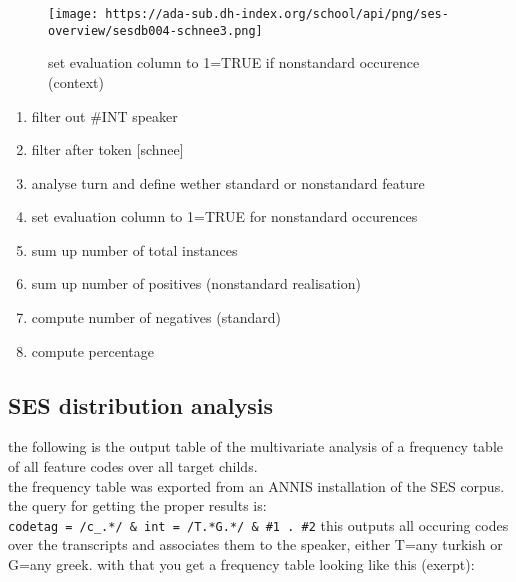 \documentclass[
  12pt,
]{article}
\providecommand{\tightlist}{%
  \setlength{\itemsep}{0pt}\setlength{\parskip}{0pt}}
\begin{document}
\begin{figure}
\centering
\texttt{[image: https://ada-sub.dh-index.org/school/api/png/ses-overview/sesdb004-schnee3.png]}
\caption{set evaluation column to 1=TRUE if nonstandard occurence
(context)}
\end{figure}

\begin{enumerate}
\def\labelenumi{\arabic{enumi}.}
\tightlist
\item
  filter out \#INT speaker
\item
  filter after token {[}schnee{]}
\item
  analyse turn and define wether standard or nonstandard feature
\item
  set evaluation column to 1=TRUE for nonstandard occurences
\item
  sum up number of total instances
\item
  sum up number of positives (nonstandard realisation)
\item
  compute number of negatives (standard)
\item
  compute percentage
\end{enumerate}

\hypertarget{ses-distribution-analysis}{%
\subsection{SES distribution analysis}\label{ses-distribution-analysis}}

the following is the output table of the multivariate analysis of a
frequency table of all feature codes over all target childs.\\
the frequency table was exported from an ANNIS installation of the SES
corpus. the query for getting the proper results is:\\
\texttt{codetag\ =\ /c\_.*/\ \&\ int\ =\ /T.*\textbar{}G.*/\ \&\ \#1\ .\ \#2}
this outputs all occuring codes over the transcripts and associates them
to the speaker, either T=any turkish or G=any greek. with that you get a
frequency table looking like this (exerpt):
\end{document}
